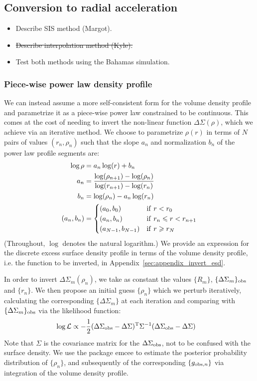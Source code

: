 \documentclass[usenatbib]{mnras}
\begin{document}
\subsection{Conversion to radial acceleration}
\label{sec:conversion}
\begin{itemize}
	\item Describe SIS method (Margot).
	\item \sout{Describe interpolation method (Kyle).}
	\item Test both methods using the Bahamas simulation.
\end{itemize}

\subsubsection{Piece-wise power law density profile}

We can instead assume a more self-consistent form for the volume density profile and parametrize it as a piece-wise power law constrained to be continuous. This comes at the cost of needing to invert the non-linear function $\Delta\Sigma(\rho)$, which we achieve via an iterative method. We choose to parametrize $\rho(r)$ in terms of $N$ pairs of values $(r_n,\rho_n)$ such that the slope $a_n$ and normalization $b_n$ of the power law profile segments are:
\begin{align}
  \log\rho &= a_n \log(r) + b_n \\
  a_n &= \frac{\log(\rho_{n+1})-\log(\rho_n)}{\log(r_{n+1})-\log(r_n)}\\
  b_n &= \log(\rho_n) - a_n\log(r_n)\\
  (a_n, b_n) &=
  \begin{cases}
    (a_0, b_0) & {\rm if}\ r < r_0\\
    (a_n, b_n) & {\rm if}\ r_n \leq r < r_{n+1}\\
    (a_{N-1}, b_{N-1}) & {\rm if}\ r \geq r_N
  \end{cases}
\label{eq:rho_piecewise_powerlaw}\end{align}
(Throughout, $\log$ denotes the natural logarithm.) We provide an expression for the discrete excess surface density profile in terms of the volume density profile, i.e. the function to be inverted, in Appendix~\ref{sec:appendix_invert_esd}.

In order to invert $\Delta\Sigma_m(\rho_n)$, we take as constant the values $\{R_m\}$, $\{\Delta\Sigma_m\}_{\rm obs}$ and $\{r_n\}$. We then propose an initial guess $\{\rho_n\}$ which we perturb iteratively, calculating the corresponding $\{\Delta\Sigma_m\}$ at each iteration and comparing with $\{\Delta\Sigma_m\}_{\rm obs}$ via the likelihood function:
\begin{align}
\log\mathcal{L} &\propto -\frac{1}{2}(\Delta\Sigma_{\rm obs}-\Delta\Sigma)^{\rm T}\Sigma^{-1}(\Delta\Sigma_{\rm obs}-\Delta\Sigma)
\end{align}
Note that $\Sigma$ is the covariance matrix for the $\Delta\Sigma_{\rm obs}$, not to be confused with the surface density. We use the package {\sc emcee} \citep{foreman-mackey13} to estimate the posterior probability distribution of $\{\rho_n\}$, and subsequently of the corresponding $\{g_{{\rm obs},n}\}$ via integration of the volume density profile.
\end{document}
